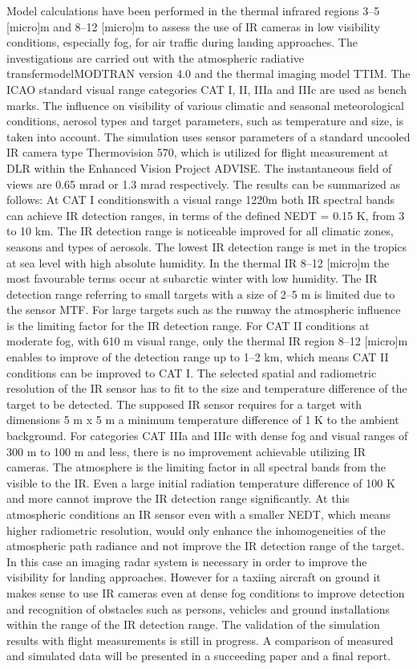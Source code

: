 \documentclass[utf8,bachelor,manualbib]{gradu3}
\begin{document}
Model calculations have been performed in the thermal
infrared regions 3–5 [micro]m and 8–12 [micro]m to assess the use of IR
cameras in low visibility conditions, especially fog, for air
traffic during landing approaches. The investigations are carried
out with the atmospheric radiative transfermodelMODTRAN
version 4.0 and the thermal imaging model TTIM.
The ICAO standard visual range categories CAT I, II, IIIa
and IIIc are used as bench marks. The influence on visibility
of various climatic and seasonal meteorological conditions,
aerosol types and target parameters, such as temperature and
size, is taken into account. The simulation uses sensor parameters
of a standard uncooled IR camera type Thermovision
570, which is utilized for flight measurement at DLR
within the Enhanced Vision Project ADVISE. The instantaneous
field of views are 0.65 mrad or 1.3 mrad respectively.
The results can be summarized as follows: At CAT I
conditionswith a visual range 1220m both IR spectral bands
can achieve IR detection ranges, in terms of the defined
NEDT = 0.15 K, from 3 to 10 km. The IR detection range
is noticeable improved for all climatic zones, seasons and
types of aerosols. The lowest IR detection range is met in
the tropics at sea level with high absolute humidity. In the
thermal IR 8–12 [micro]m the most favourable terms occur at
subarctic winter with low humidity. The IR detection range
referring to small targets with a size of 2–5 m is limited
due to the sensor MTF. For large targets such as the runway
the atmospheric influence is the limiting factor for the IR
detection range.
For CAT II conditions at moderate fog, with 610 m
visual range, only the thermal IR region 8–12 [micro]m enables to
improve of the detection range up to 1–2 km, which means
CAT II conditions can be improved to CAT I. The selected
spatial and radiometric resolution of the IR sensor has to
fit to the size and temperature difference of the target to be
detected. The supposed IR sensor requires for a target with
dimensions 5 m x 5 m a minimum temperature difference
of 1 K to the ambient background.
For categories CAT IIIa and IIIc with dense fog and visual
ranges of 300 m to 100 m and less, there is no improvement
achievable utilizing IR cameras. The atmosphere is the
limiting factor in all spectral bands from the visible to the
IR. Even a large initial radiation temperature difference of
100 K and more cannot improve the IR detection range
significantly. At this atmospheric conditions an IR sensor
even with a smaller NEDT, which means higher radiometric
resolution, would only enhance the inhomogeneities of the
atmospheric path radiance and not improve the IR detection
range of the target. In this case an imaging radar system
is necessary in order to improve the visibility for landing
approaches. However for a taxiing aircraft on ground it
makes sense to use IR cameras even at dense fog conditions
to improve detection and recognition of obstacles such as
persons, vehicles and ground installations within the range
of the IR detection range.
The validation of the simulation results with flight measurements
is still in progress. A comparison of measured and
simulated data will be presented in a succeeding paper and a
final report. \citep{beiergemperlein2004}
\end{document}
